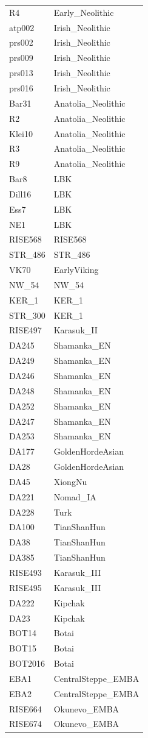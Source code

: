 \begin{longtable}[t]{ll}
R4 & Early\_Neolithic\\
atp002 & Irish\_Neolithic\\
prs002 & Irish\_Neolithic\\
prs009 & Irish\_Neolithic\\
prs013 & Irish\_Neolithic\\
prs016 & Irish\_Neolithic\\
Bar31 & Anatolia\_Neolithic\\
R2 & Anatolia\_Neolithic\\
Klei10 & Anatolia\_Neolithic\\
R3 & Anatolia\_Neolithic\\
R9 & Anatolia\_Neolithic\\
Bar8 & LBK\\
Dill16 & LBK\\
Ess7 & LBK\\
NE1 & LBK\\
RISE568 & RISE568\\
STR\_486 & STR\_486\\
VK70 & EarlyViking\\
NW\_54 & NW\_54\\
KER\_1 & KER\_1\\
STR\_300 & KER\_1\\
RISE497 & Karasuk\_II\\
DA245 & Shamanka\_EN\\
DA249 & Shamanka\_EN\\
DA246 & Shamanka\_EN\\
DA248 & Shamanka\_EN\\
DA252 & Shamanka\_EN\\
DA247 & Shamanka\_EN\\
DA253 & Shamanka\_EN\\
DA177 & GoldenHordeAsian\\
DA28 & GoldenHordeAsian\\
DA45 & XiongNu\\
DA221 & Nomad\_IA\\
DA228 & Turk\\
DA100 & TianShanHun\\
DA38 & TianShanHun\\
DA385 & TianShanHun\\
RISE493 & Karasuk\_III\\
RISE495 & Karasuk\_III\\
DA222 & Kipchak\\
DA23 & Kipchak\\
BOT14 & Botai\\
BOT15 & Botai\\
BOT2016 & Botai\\
EBA1 & CentralSteppe\_EMBA\\
EBA2 & CentralSteppe\_EMBA\\
RISE664 & Okunevo\_EMBA\\
RISE674 & Okunevo\_EMBA\\*
\end{longtable}
\endgroup{}

